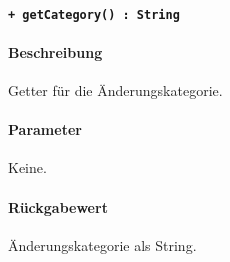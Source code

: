 \paragraph{\texttt{+ getCategory() : String}}\label{AP_ChangeAction_getCategory}%
\paragraph*{Beschreibung}
Getter für die Änderungskategorie.
\paragraph*{Parameter}
Keine.
\paragraph*{Rückgabewert}
Änderungskategorie als String.